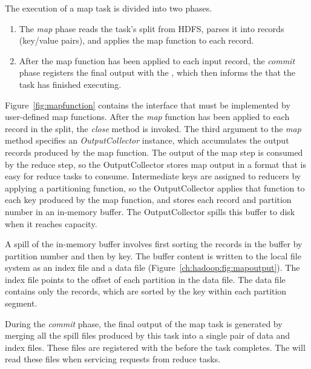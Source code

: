 The execution of a map task is divided into two phases.
\begin{enumerate}
\item
  The \emph{map} phase reads the task's split from HDFS, parses it into
  records (key/value pairs), and applies the map function to each
  record.
\item
  After the map function has been applied to each input record, the
  \emph{commit} phase registers the final output with the {\TT}, which
  then informs the {\JT} that the task has finished executing.
\end{enumerate}

Figure~\ref{fig:mapfunction} contains the interface that must be implemented by
user-defined map functions.  After the \emph{map} function has been applied to
each record in the split, the \emph{close} method is invoked.  The third
argument to the \emph{map} method specifies an \emph{OutputCollector} instance,
which accumulates the output records produced by the map function.  The output
of the map step is consumed by the reduce step, so the OutputCollector stores
map output in a format that is easy for reduce tasks to consume.  Intermediate
keys are assigned to reducers by applying a partitioning function, so the
OutputCollector applies that function to each key produced by the map function,
and stores each record and partition number in an in-memory buffer.  The
OutputCollector spills this buffer to disk when it reaches capacity.

A spill of the in-memory buffer involves first sorting the records in the
buffer by partition number and then by key.  The buffer content is written to
the local file system as an index file and a data file
(Figure~\ref{ch:hadoop:fig:mapoutput}).  The index file points to the offset of
each partition in the data file.  The data file contains only the records,
which are sorted by the key within each partition segment.

During the \emph{commit} phase, the final output of the map task is generated
by merging all the spill files produced by this task into a single pair of data
and index files.  These files are registered with the {\TT} before the task
completes.  The \TT will read these files when servicing requests from reduce
tasks.


